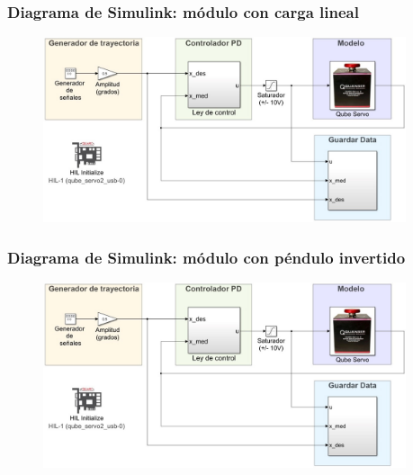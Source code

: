 \begin{frame}
\begin{figure}
     \end{figure}
\end{frame}

\begin{frame}
\frametitle{Diagrama de Simulink: módulo con carga lineal}
\begin{figure}
\centering
\includegraphics[width=0.95\textwidth]{simulink_qube_disk.jpeg}
\end{figure}

\end{frame}

\begin{frame}
\frametitle{Diagrama de Simulink: módulo con péndulo invertido}
\begin{figure}
\centering
\includegraphics[width=0.95\textwidth]{simulink_qube_disk.jpeg}
\end{figure}

\end{frame}

